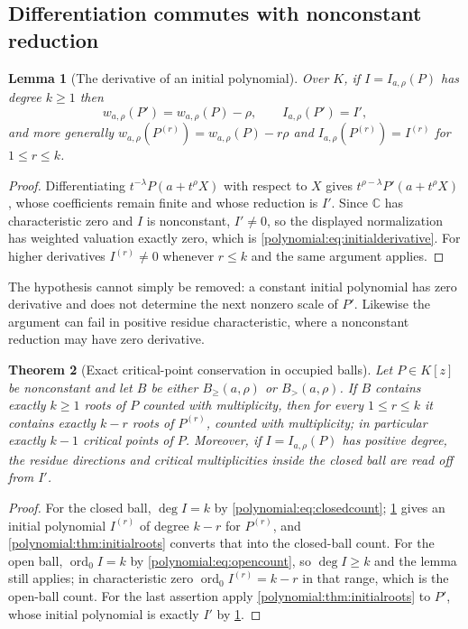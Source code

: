\documentclass[11pt,letterpaper]{article}
\numberwithin{equation}{section}
\newtheorem{theorem}{Theorem}[section]
\newtheorem{lemma}[theorem]{Lemma}
\theoremstyle{definition}
\theoremstyle{remark}\newtheorem{remark}[theorem]{Remark}
\newcommand{\C}{\mathbb C}
\newcommand{\ord}{\operatorname{ord}}
\newcommand{\Bge}[2]{B_{\ge}(#1,#2)}
\newcommand{\Bgt}[2]{B_{>}(#1,#2)}
\begin{document}
\subsection{Differentiation commutes with nonconstant reduction}
\begin{lemma}[The derivative of an initial polynomial]
\label{polynomial:lem:initialderivative}
Over $K$, if $I=I_{a,\rho}(P)$ has degree $k\ge1$ then
\begin{equation}\label{polynomial:eq:initialderivative}
 w_{a,\rho}(P')=w_{a,\rho}(P)-\rho,\qquad I_{a,\rho}(P')=I' ,
\end{equation}
and more generally $w_{a,\rho}(P^{(r)})=w_{a,\rho}(P)-r\rho$ and
$I_{a,\rho}(P^{(r)})=I^{(r)}$ for $1\le r\le k$.
\end{lemma}
\begin{proof}
Differentiating $t^{-\lambda}P(a+t^\rho X)$ with respect to $X$ gives
$t^{\rho-\lambda}P'(a+t^\rho X)$, whose coefficients remain finite and whose
reduction is $I'$. Since $\C$ has characteristic zero and $I$ is nonconstant,
$I'\ne0$, so the displayed normalization has weighted valuation exactly zero,
which is \eqref{polynomial:eq:initialderivative}. For higher derivatives
$I^{(r)}\ne0$ whenever $r\le k$ and the same argument applies.
\end{proof}

The hypothesis cannot simply be removed: a constant initial polynomial has
zero derivative and does not determine the next nonzero scale of $P'$.
Likewise the argument can fail in positive residue characteristic, where a
nonconstant reduction may have zero derivative.

\begin{theorem}[Exact critical-point conservation in occupied balls]
\label{polynomial:thm:criticalballs}
Let $P\in K[z]$ be nonconstant and let $B$ be either $\Bge a\rho$ or
$\Bgt a\rho$. If $B$ contains exactly $k\ge1$ roots of $P$ counted with
multiplicity, then for every $1\le r\le k$ it contains exactly $k-r$ roots of
$P^{(r)}$, counted with multiplicity; in particular exactly $k-1$ critical
points of $P$. Moreover, if $I=I_{a,\rho}(P)$ has positive degree, the residue
directions and critical multiplicities inside the closed ball are read off
from $I'$.
\end{theorem}
\begin{proof}
For the closed ball, $\deg I=k$ by
\eqref{polynomial:eq:closedcount}; \cref{polynomial:lem:initialderivative}
gives an initial polynomial $I^{(r)}$ of degree $k-r$ for $P^{(r)}$, and
\cref{polynomial:thm:initialroots} converts that into the closed-ball count.
For the open ball, $\ord_0I=k$ by \eqref{polynomial:eq:opencount}, so
$\deg I\ge k$ and the lemma still applies; in characteristic zero
$\ord_0I^{(r)}=k-r$ in that range, which is the open-ball count. For the last
assertion apply \cref{polynomial:thm:initialroots} to $P'$, whose initial
polynomial is exactly $I'$ by \cref{polynomial:lem:initialderivative}.
\end{proof}
\end{document}
